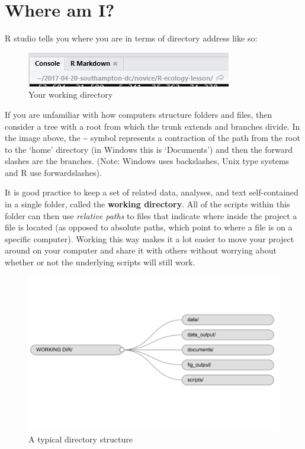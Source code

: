 \documentclass[12pt,]{book}
\begin{document}
\hypertarget{where-am-i}{%
\section{Where am I?}\label{where-am-i}}

R studio tells you where you are in terms of directory address like so:



\begin{figure}

{\centering \includegraphics[width=0.8\linewidth]{img/rstudio_working_directory} 

}

\caption{Your working directory}\label{fig:working-directory}
\end{figure}

If you are unfamiliar with how computers structure folders and files, then
consider a tree with a root from which the trunk extends and branches divide.
In the image above, the \textasciitilde{} symbol represents a contraction of the path from the
root to the `home' directory (in Windows this is `Documents') and then the
forward slashes are the branches. (Note: Windows uses backslashes, Unix type
systems and R use forwardslashes).

It is good practice to keep a set of related data, analyses, and text
self-contained in a single folder, called the \textbf{working directory}. All of the
scripts within this folder can then use \emph{relative paths} to files that indicate
where inside the project a file is located (as opposed to absolute paths, which
point to where a file is on a specific computer). Working this way makes it
a lot easier to move your project around on your computer and share it with
others without worrying about whether or not the underlying scripts will still
work.



\begin{figure}

{\centering \includegraphics[width=0.8\linewidth]{img/R-ecology-work_dir_structure} 

}

\caption{A typical directory structure}\label{fig:dir-structure}
\end{figure}
\end{document}
